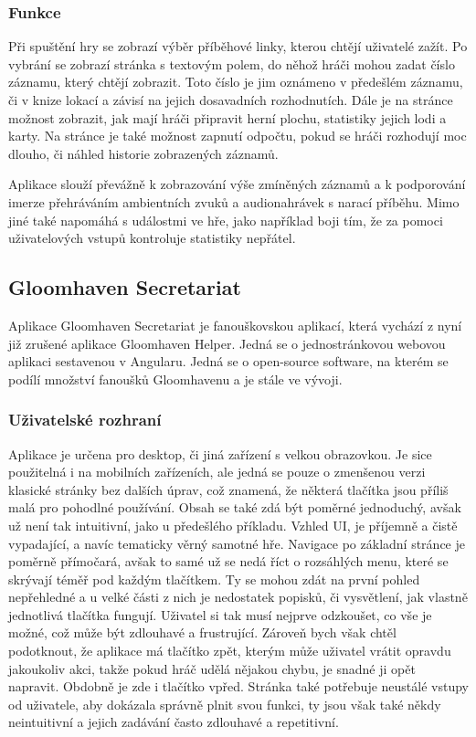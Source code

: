 \subsubsection*{Funkce}
Při spuštění hry se zobrazí výběr příběhové linky, kterou chtějí uživatelé zažít. Po vybrání se zobrazí stránka s textovým polem, do něhož hráči mohou zadat číslo záznamu, který chtějí zobrazit. Toto číslo je jim oznámeno v předešlém záznamu, či v knize lokací a závisí na jejich dosavadních rozhodnutích. Dále je na stránce možnost zobrazit, jak mají hráči připravit herní plochu, statistiky jejich lodi a karty. Na stránce je také možnost zapnutí odpočtu, pokud se hráči rozhodují moc dlouho, či náhled historie zobrazených záznamů.

Aplikace slouží převážně k zobrazování výše zmíněných záznamů a k podporování imerze přehráváním ambientních zvuků a audionahrávek s narací příběhu. Mimo jiné také napomáhá s událostmi ve hře, jako například boji tím, že za pomoci uživatelových vstupů kontroluje statistiky nepřátel.
\pagebreak

\subsection{Gloomhaven Secretariat}
Aplikace Gloomhaven Secretariat je fanouškovskou aplikací, která vychází z nyní již zrušené aplikace Gloomhaven Helper. Jedná se o jednostránkovou webovou aplikaci sestavenou v Angularu. Jedná se o open-source software, na kterém se podílí množství fanoušků Gloomhavenu a je stále ve vývoji.\cite{gloomhaven_secretariat_github}

\subsubsection*{Uživatelské rozhraní}
Aplikace je určena pro desktop, či jiná zařízení s velkou obrazovkou. Je sice použitelná i na mobilních zařízeních, ale jedná se pouze o zmenšenou verzi klasické stránky bez dalších úprav, což znamená, že některá tlačítka jsou příliš malá pro pohodlné používání. Obsah se také zdá být poměrné jednoduchý, avšak už není tak intuitivní, jako u předešlého příkladu. Vzhled UI, je příjemně a čistě vypadající, a navíc tematicky věrný samotné hře. Navigace po základní stránce je poměrně přímočará, avšak to samé už se nedá říct o rozsáhlých menu, které se skrývají téměř pod každým tlačítkem. Ty se mohou zdát na první pohled nepřehledné a u velké části z nich je nedostatek popisků, či vysvětlení, jak vlastně jednotlivá tlačítka fungují. Uživatel si tak musí nejprve odzkoušet, co vše je možné, což může být zdlouhavé a frustrující. Zároveň bych však chtěl podotknout, že aplikace má tlačítko zpět, kterým může uživatel vrátit opravdu jakoukoliv akci, takže pokud hráč udělá nějakou chybu, je snadné ji opět napravit. Obdobně je zde i tlačítko vpřed. Stránka také potřebuje neustálé vstupy od uživatele, aby dokázala správně plnit svou funkci, ty jsou však také někdy neintuitivní a jejich zadávání často zdlouhavé a repetitivní.

